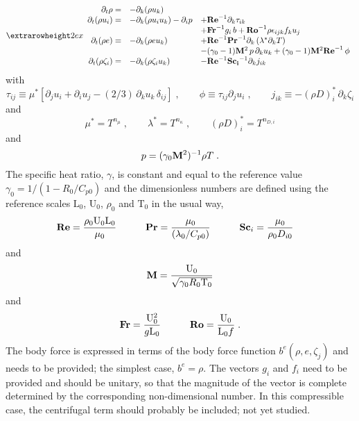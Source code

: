 \begin{equation}
\setlength{\extrarowheight}{2ex}
\begin{array}{rll}
  \partial_t \rho =&
  -\partial_k (\rho u_k)  & \\
  \partial_t (\rho u_i) =& 
  -\partial_k (\rho u_i u_k )- \partial_i p &
  +\mathrm{\bf Re}^{-1}\partial_k \tau_{ik}\\
  & & +\mathrm{\bf Fr}^{-1} g_i\,b+\mathrm{\bf Ro}^{-1}\rho\epsilon_{ijk} f_ku_j  \\
  \partial_t (\rho e) =& 
  -\partial_k (\rho e u_k ) &
  +\mathrm{\bf Re}^{-1}\mathrm{\bf Pr}^{-1} \partial_k \left(\lambda^{*} \partial_k T\right) \\
  & &-(\gamma_0-1)\mathrm{\bf M}^2\,p\, \partial_k u_k  + (\gamma_0-1)\mathrm{\bf M}^2\mathrm{\bf Re}^{-1}\,\phi \\
  \partial_t (\rho \zeta_i)=&
  -\partial_k (\rho \zeta_i u_k) &
  - \mathrm{\bf Re}^{-1}\mathrm{\bf Sc_i}^{-1} \partial_k j_{ik}
\end{array}
\end{equation}
with
\begin{equation}
  \tau_{ij} \equiv  \mu^*\left[\partial_j u_i +  \partial_i u_j - 
  (2/3)\, \partial_k u_k\,\delta_{ij}\right]\;,\qquad
  \phi \equiv \tau_{ij} \partial_j u_i\;,\qquad
  j_{ik}  \equiv -(\rho D)_i^{*}\, \partial_k \zeta_i
\end{equation}
and
\begin{equation}
  \mu^{*} =  T^{n_\mu}\;,\qquad \lambda^{*} = T^{n_\kappa} \;,\qquad (\rho D)_i^{*}  =  T^{n_{D,i}}
\end{equation}
and
\begin{equation}
  p  = (\gamma_0 \mathrm{\bf M}^2)^{-1}\rho T \;.
  \label{eq:state}
\end{equation}
The specific heat ratio, $\gamma$, is constant and equal to the reference value
$\gamma_0=1/(1-R_0/C_{p0})$ and the dimensionless numbers are defined using the
reference scales $\mathrm{L}_0$, $\mathrm{U}_0$, $\rho_0$
and $\mathrm{T}_0$ in the usual way,
\begin{alignat*}{3}
  \mathrm{\bf Re} & = \frac{\rho_0 \mathrm{U}_0 \mathrm{L}_0}{\mu_0} & \qquad 
  \mathrm{\bf Pr} & = \frac{\mu_0}{(\lambda_0/C_{p0})} & \qquad
  \mathrm{\bf Sc}_i & = \frac{\mu_0}{\rho_0 D_{i0}} 
\end{alignat*}
and
\begin{equation*}
  \mathrm{\bf M}  = \frac{\mathrm{U}_0}{\sqrt{\gamma_0 R_0 \mathrm{T}_0}} 
\end{equation*}
and
\begin{alignat*}{2}
\mathrm{\bf Fr} & = \frac{\mathrm{U}_0^2}{g\mathrm{L}_0} & \qquad \mathrm{\bf
  Ro} = \frac{\mathrm{U}_0}{\mathrm{L}_0f} \;.
\end{alignat*}
The body force is expressed in terms of the body force function
$b^e(\rho,e,\zeta_j)$ and needs to be provided; the simplest case, $b^e=\rho$. The
vectors $g_i$ and $f_i$ need to be provided and should be unitary, so that the
magnitude of the vector is complete determined by the corresponding
non-dimensional number. In this compressible case, the centrifugal term should
probably be included; not yet studied.

